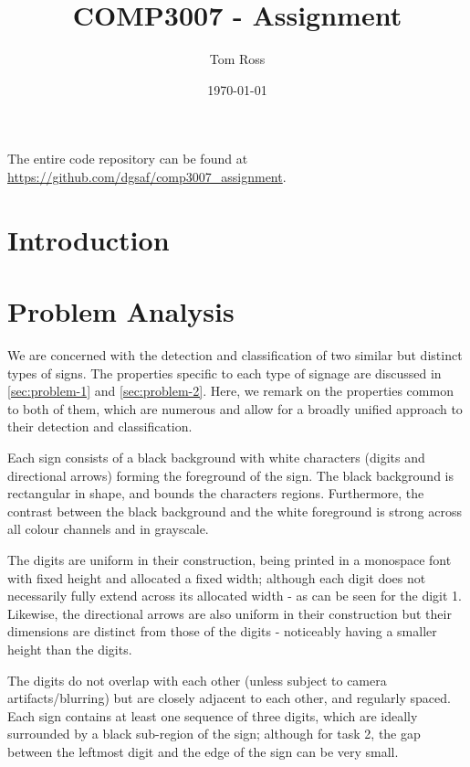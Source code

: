 \documentclass{article}
\title{COMP3007 - Assignment}
\author{Tom Ross}
\date{\today}
\begin{document}
The entire code repository can be found at
\url{https://github.com/dgsaf/comp3007_assignment}.

\tableofcontents

\listoffigures

\listoftables

\clearpage

\section{Introduction}
\label{sec:introduction}

\section{Problem Analysis}
\label{sec:problem-analysis}

We are concerned with the detection and classification of two similar but
distinct types of signs.
The properties specific to each type of signage are discussed in
\autoref{sec:problem-1} and \autoref{sec:problem-2}.
Here, we remark on the properties common to both of them, which are numerous and
allow for a broadly unified approach to their detection and classification.

Each sign consists of a black background with white characters (digits and
directional arrows) forming the foreground of the sign.
The black background is rectangular in shape, and bounds the characters
regions.
Furthermore, the contrast between the black background and the white foreground
is strong across all colour channels and in grayscale.

The digits are uniform in their construction, being printed in a monospace
font with fixed height and allocated a fixed width; although each digit does
not necessarily fully extend across its allocated width - as can be seen for the
digit 1.
Likewise, the directional arrows are also uniform in their construction but
their dimensions are distinct from those of the digits - noticeably having a
smaller height than the digits.

The digits do not overlap with each other (unless subject to camera
artifacts/blurring) but are closely adjacent to each other, and regularly
spaced.
Each sign contains at least one sequence of three digits, which are ideally
surrounded by a black sub-region of the sign; although for task 2, the gap
between the leftmost digit and the edge of the sign can be very small.
\end{document}
